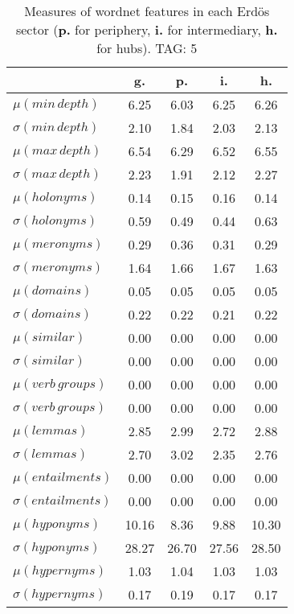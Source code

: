 \begin{table}[h!]
\begin{center}
\begin{tabular}{| l || c | c | c | c |}\hline
 & {\bf g.} & {\bf p.} & {\bf i.} & {\bf h.} \\\hline\hline
$\mu(min\,depth)$ & 6.25  & 6.03  & 6.25  & 6.26 \\
$\sigma(min\,depth)$ & 2.10  & 1.84  & 2.03  & 2.13 \\\hline
$\mu(max\,depth)$ & 6.54  & 6.29  & 6.52  & 6.55 \\
$\sigma(max\,depth)$ & 2.23  & 1.91  & 2.12  & 2.27 \\\hline
$\mu(holonyms)$ & 0.14  & 0.15  & 0.16  & 0.14 \\
$\sigma(holonyms)$ & 0.59  & 0.49  & 0.44  & 0.63 \\\hline
$\mu(meronyms)$ & 0.29  & 0.36  & 0.31  & 0.29 \\
$\sigma(meronyms)$ & 1.64  & 1.66  & 1.67  & 1.63 \\\hline
$\mu(domains)$ & 0.05  & 0.05  & 0.05  & 0.05 \\
$\sigma(domains)$ & 0.22  & 0.22  & 0.21  & 0.22 \\\hline
$\mu(similar)$ & 0.00  & 0.00  & 0.00  & 0.00 \\
$\sigma(similar)$ & 0.00  & 0.00  & 0.00  & 0.00 \\\hline
$\mu(verb\,groups)$ & 0.00  & 0.00  & 0.00  & 0.00 \\
$\sigma(verb\,groups)$ & 0.00  & 0.00  & 0.00  & 0.00 \\\hline
$\mu(lemmas)$ & 2.85  & 2.99  & 2.72  & 2.88 \\
$\sigma(lemmas)$ & 2.70  & 3.02  & 2.35  & 2.76 \\\hline
$\mu(entailments)$ & 0.00  & 0.00  & 0.00  & 0.00 \\
$\sigma(entailments)$ & 0.00  & 0.00  & 0.00  & 0.00 \\\hline
$\mu(hyponyms)$ & 10.16  & 8.36  & 9.88  & 10.30 \\
$\sigma(hyponyms)$ & 28.27  & 26.70  & 27.56  & 28.50 \\\hline
$\mu(hypernyms)$ & 1.03  & 1.04  & 1.03  & 1.03 \\
$\sigma(hypernyms)$ & 0.17  & 0.19  & 0.17  & 0.17 \\\hline
\end{tabular}
\caption{Measures of wordnet features in each Erd\"os sector ({{\bf p.}} for periphery, {{\bf i.}} for intermediary, {{\bf h.}} for hubs). TAG: 5}
\end{center}
\end{table}